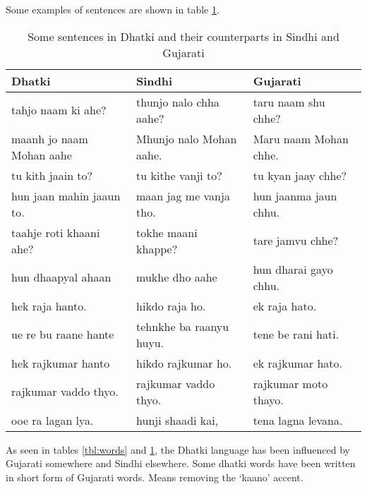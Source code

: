 Some examples of sentences are shown in table \ref{tbl:sent}.
\begin{table}
\begin{center}
\begin{tabular}{l|l|l}
\hline
\textbf{Dhatki} & \textbf{Sindhi} & \textbf{Gujarati} \\
\hline
tahjo naam ki ahe? & thunjo nalo chha aahe? & taru naam shu chhe? \\ 
maanh jo naam Mohan aahe & Mhunjo nalo Mohan aahe. & Maru naam Mohan chhe. \\ 
tu kith jaain to? & tu kithe vanji to? & tu kyan jaay chhe? \\ 
hun jaan mahin jaaun to. & maan jag me vanja tho. & hun jaanma jaun chhu. \\ 
taahje roti khaani ahe? & tokhe maani khappe? & tare jamvu chhe? \\ 
hun dhaapyal ahaan & mukhe dho aahe & hun dharai gayo chhu. \\ 
hek raja hanto. & hikdo raja ho. & ek raja hato. \\ 
ue re bu raane hante & tehnkhe ba raanyu huyu. & tene be rani hati. \\ 
hek rajkumar hanto & hikdo rajkumar ho. & ek rajkumar hato. \\ 
rajkumar vaddo thyo. & rajkumar vaddo thyo. & rajkumar moto thayo. \\ 
ooe ra lagan lya. & hunji shaadi kai, & tena lagna levana.\\
\hline
\end{tabular}
\end{center}
\caption{Some sentences in Dhatki and their counterparts in Sindhi and Gujarati}
\label{tbl:sent}
\end{table}
As seen in tables \ref{tbl:words} and \ref{tbl:sent}, the Dhatki language has
been influenced by Gujarati somewhere and Sindhi elsewhere. Some dhatki words
have been written in short form of Gujarati words. Means removing the `kaano'
accent.

